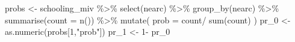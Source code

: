 \documentclass[
]{article}
\newenvironment{Shaded}{\begin{snugshade}}{\end{snugshade}}
\newcommand{\AttributeTok}[1]{\textcolor[rgb]{0.77,0.63,0.00}{#1}}
\newcommand{\DecValTok}[1]{\textcolor[rgb]{0.00,0.00,0.81}{#1}}
\newcommand{\FunctionTok}[1]{\textcolor[rgb]{0.00,0.00,0.00}{#1}}
\newcommand{\NormalTok}[1]{#1}
\newcommand{\OtherTok}[1]{\textcolor[rgb]{0.56,0.35,0.01}{#1}}
\newcommand{\SpecialCharTok}[1]{\textcolor[rgb]{0.00,0.00,0.00}{#1}}
\newcommand{\StringTok}[1]{\textcolor[rgb]{0.31,0.60,0.02}{#1}}
\begin{document}
\begin{Shaded}
\begin{Highlighting}[]
\NormalTok{probs }\OtherTok{\textless{}{-}}\NormalTok{ schooling\_miv }\SpecialCharTok{\%\textgreater{}\%} 
  \FunctionTok{select}\NormalTok{(nearc) }\SpecialCharTok{\%\textgreater{}\%} \FunctionTok{group\_by}\NormalTok{(nearc) }\SpecialCharTok{\%\textgreater{}\%} 
  \FunctionTok{summarise}\NormalTok{(}\AttributeTok{count =} \FunctionTok{n}\NormalTok{()) }\SpecialCharTok{\%\textgreater{}\%} \FunctionTok{mutate}\NormalTok{(}
    \AttributeTok{prob =}\NormalTok{ count}\SpecialCharTok{/} \FunctionTok{sum}\NormalTok{(count)}
\NormalTok{  )}
\NormalTok{pr\_0 }\OtherTok{\textless{}{-}} \FunctionTok{as.numeric}\NormalTok{(probs[}\DecValTok{1}\NormalTok{,}\StringTok{"prob"}\NormalTok{])}
\NormalTok{pr\_1 }\OtherTok{\textless{}{-}} \DecValTok{1}\SpecialCharTok{{-}}\NormalTok{ pr\_0}


\end{Highlighting}
\end{Shaded}
\end{document}
